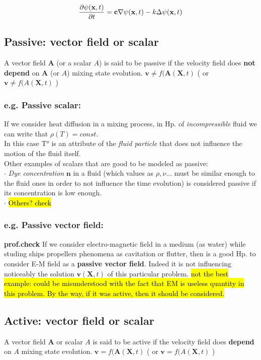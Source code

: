 \documentclass[a4paper,11pt]{article}
\newcommand{\cic}[1]{\mathbf{#1}}
\begin{document}
 \[  \pdv{\psi (\cic{x},t)}{t}= \cic{c} \nabla \psi (\cic{x},t) - k \Delta \psi (\cic{x},t)  \]
 
\subsection{Passive: vector field or scalar}
 A vector field $\cic{A}$ (or a scalar $A$) is said to be passive if the velocity field does \textbf{not depend} on $\cic{A}$ (or $A$) mixing state evolution.
 $ \cic{v} \neq f(\cic{A}(\cic{X},t) $  ( or $ \cic{v} \neq f(A(\cic{X},t) $ )
	\subsubsection{e.g. Passive scalar:}
If we consider heat diffusion in a mixing process, in Hp. of \emph{incompressible} fluid we can write that  $ \rho(T)=const. $ \\
In this case T° is an attribute of the \emph{fluid particle} that does not influence the motion of the fluid itself. \\
Other examples of scalars that are good to be modeled as passive: \\
$\cdot$ \emph{Dye concentration} $\cic{n}$ in a fluid (which values as $\rho , \nu ...$ must be similar enough to the fluid ones in order to not influence the time evolution) is considered passive if its concentration is low enough. \\
$\cdot$ \hl{ Others? check}
	\subsubsection{e.g. Passive vector field:} \textbf{prof.check}
If we consider electro-magnetic field in a medium (as water) while studing ships propellers phenomena as cavitation or flutter, then is a good Hp. to consider E-M field as a \textbf{passive vector field}. 
Indeed it is not influencing noticeably the solution $\cic{v}(\cic{X},t)$ of this particular problem. 
\hl{ not the best example: could be misunderstood with the fact that EM is useless quantity in this problem. By the way, if it was active, then it should be considered.}
 
 \subsection{Active: vector field or scalar}
 A vector field $\cic{A}$ or scalar $A$ is said to be active if the velocity field does \textbf{depend} on $A$ mixing state evolution.
  $ \cic{v} = f(\cic{A}(\cic{X},t) $  ( or $ \cic{v} = f(A(\cic{X},t) $ )
\end{document}
